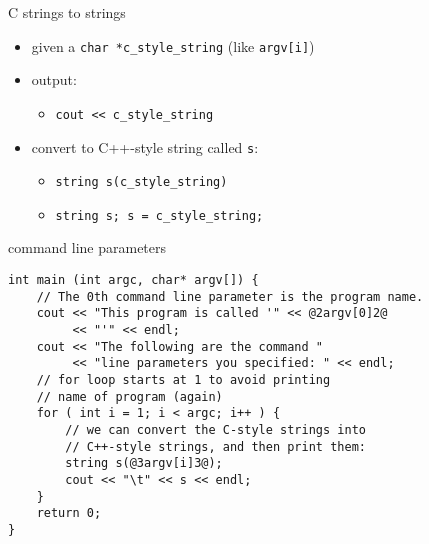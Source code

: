 \begin{frame}[fragile,label=cStringVString]{C strings to strings}
\begin{itemize}
\item given a \lstinline|char *c_style_string| (like \lstinline|argv[i]|)
\vspace{.5cm}
\item output:
    \begin{itemize}
    \item \lstinline|cout << c_style_string|
    \end{itemize}
\item convert to C++-style string called \texttt{s}:
    \begin{itemize}
    \item \lstinline|string s(c_style_string)| 
    \item \lstinline|string s; s = c_style_string;| 
    \end{itemize}
\end{itemize}
\end{frame}


\begin{frame}[fragile,label=cmdLinePEx]{command line parameters}
\begin{lstlisting}
int main (int argc, char* argv[]) {
    // The 0th command line parameter is the program name.
    cout << "This program is called '" << @2argv[0]2@
         << "'" << endl;
    cout << "The following are the command " 
         << "line parameters you specified: " << endl;
    // for loop starts at 1 to avoid printing
    // name of program (again)
    for ( int i = 1; i < argc; i++ ) {
        // we can convert the C-style strings into 
        // C++-style strings, and then print them:
        string s(@3argv[i]3@);
        cout << "\t" << s << endl;
    }
    return 0;
}
\end{lstlisting}
\end{frame}
